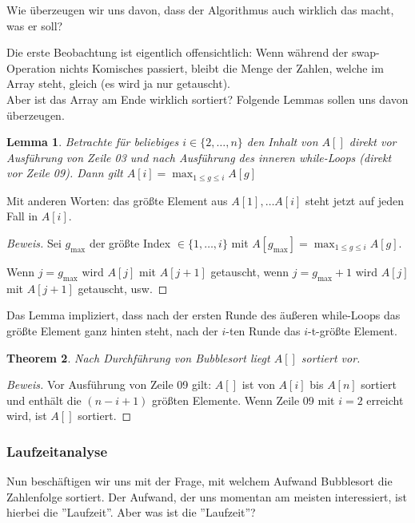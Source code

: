 \documentclass{article}
\newtheorem{thm}{Theorem}[section]
\newtheorem{lem}[thm]{Lemma}
\begin{document}
Wie überzeugen wir uns davon, dass der Algorithmus auch wirklich das macht, was er soll?

Die erste Beobachtung ist eigentlich offensichtlich: Wenn während der swap-Operation nichts 
Komisches passiert, bleibt die Menge der Zahlen, welche im Array steht, gleich 
(es wird ja nur getauscht).\\ Aber ist das Array am Ende wirklich sortiert?
Folgende Lemmas sollen uns davon überzeugen.

\begin{lem}
Betrachte für beliebiges $i\in \{2, \dots, n\}$ den Inhalt von $A[]$ direkt vor Ausführung von Zeile 03
und nach Ausführung des inneren while-Loops (direkt vor Zeile 09).
Dann gilt $A[i]=\max_{1\leq g \leq i} A[g]$
\end{lem}
Mit anderen Worten: das größte Element aus $A[1], \dots A[i]$ steht jetzt auf jeden Fall in $A[i]$.


\begin{proof}[Beweis]
Sei $g_{\max}$ der größte Index $\in \{1, \dots, i\}$ mit 
	$A[g_{\max}]=\max_{1\leq g \leq i} A[g]$.

Wenn $j=g_{\max}$ wird $A[j]$ mit $A[j+1]$ getauscht,
wenn $j=g_{\max}+1$ wird $A[j]$ mit $A[j+1]$ getauscht, usw.
\end{proof}


Das Lemma impliziert, dass nach der ersten Runde des äußeren while-Loops das größte Element
ganz hinten steht, nach der $i$-ten Runde das $i$-t-größte Element.


\begin{thm}
Nach Durchführung von Bubblesort liegt $A[]$ sortiert vor.
\end{thm}
\begin{proof}[Beweis]
Vor Ausführung von Zeile 09 gilt: $A[]$ ist von $A[i]$ bis $A[n]$ sortiert und enthält die
	$(n-i+1)$ größten Elemente. Wenn Zeile 09 mit $i=2$ erreicht wird, ist $A[]$ sortiert.
\end{proof}

\subsubsection{Laufzeitanalyse}
Nun beschäftigen wir uns mit der Frage, mit welchem Aufwand Bubblesort die Zahlenfolge sortiert.
Der Aufwand, der uns momentan am meisten interessiert, ist hierbei die ''Laufzeit''. Aber was
ist die ''Laufzeit''?
\end{document}
